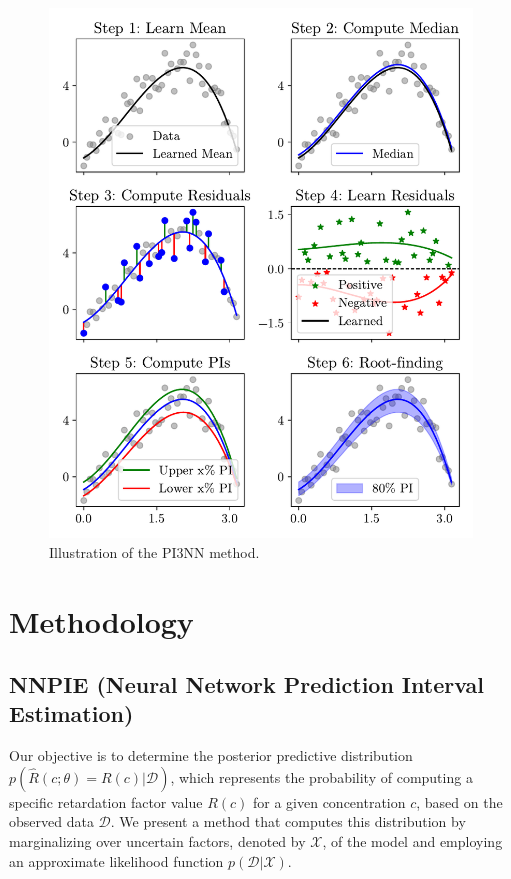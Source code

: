 \begin{figure}[h]
    \centering
    \includegraphics{figs/3pinn_illustration.pdf}
    \caption{Illustration of the PI3NN method.}
    \label{fig:3pinn_illustration}
\end{figure}





\chapter{Methodology}
\label{sec:methodology}
\section{NNPIE (Neural Network Prediction Interval Estimation)}
Our objective is to determine the posterior predictive distribution $p(\hat{R}(c;\theta) = R(c)| \mathcal{D})$, which represents the probability of computing a specific retardation factor value $R(c)$ for a given concentration $c$, based on the observed data $\mathcal{D}$. We present a method that computes this distribution by marginalizing over uncertain factors, denoted by $\mathcal{X}$, of the model and employing an approximate likelihood function $p(\mathcal{D} | \mathcal{X})$.

